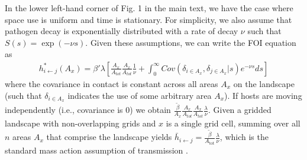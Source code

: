 \documentclass[letterpaper]{article}
\begin{document}
In the lower left-hand corner of Fig. 1 in the main text, we have the case where space use is uniform and time is stationary. For simplicity, we also assume that pathogen decay is exponentially distributed with a rate of decay $\nu$ such that $S(s) = \exp(-\nu s)$. Given these assumptions, we can write the FOI equation as
\begin{equation}
    \begin{aligned}
        h^*_{i \leftarrow j}(A_x) = \beta' \lambda \left[\frac{A_x}{A_{tot}}\frac{A_x}{A_{tot}} \frac{1}{\nu} +  \int_{0}^{\infty} Cov(\delta_{i \in A_x}, \delta_{j \in A_x} | s) e^{-\nu s} ds\right]
    \end{aligned}
    \label{eq:uniform_stationary1}
\end{equation}
where the covariance in contact is constant across all areas $A_x$ on the landscape (such that $\delta_{i \in A_x}$ indicates the use of some arbitrary area $A_x$).  
If hosts are moving independently (i.e., covariance is 0) we obtain $\frac{\tilde{\beta}}{A_x} \frac{A_x}{A_{tot}} \frac{A_x}{A_{tot}}  \frac{\lambda}{\nu}$. Given a gridded landscape with non-overlapping grids and $x$ is a single grid cell, summing over all $n$ areas $A_x$ that comprise the landscape yields $\bar{h}_{i \leftarrow j} =\frac{\tilde{\beta}}{A_\text{tot}} \frac{\lambda}{\nu}$, which is the standard mass action assumption of transmission \citep{McCallum2001}. 
\end{document}
